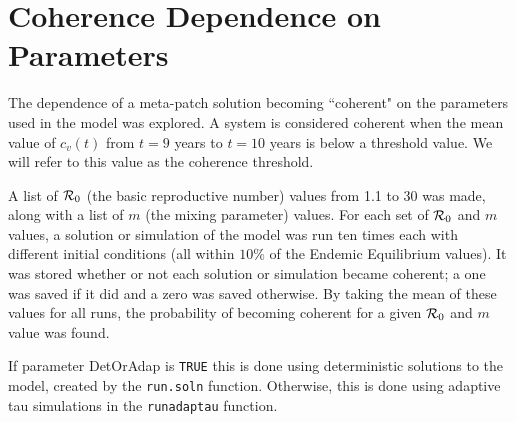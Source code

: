 \documentclass{article}\usepackage[]{graphicx}\usepackage[]{color}
\begin{document}
\section{Coherence Dependence on Parameters} 
The dependence of a meta-patch solution becoming ``coherent" on the parameters used in the model was explored. A system is considered coherent when the mean value of $c_v(t)$ from $t=9$ years to $t=10$ years is below a threshold value. We will refer to this value as the coherence threshold.
\par
A list of ${\cal R}_0$ (the basic reproductive number) values from 1.1 to 30 was made, along with a list of $m$ (the mixing parameter) values. For each set of ${\cal R}_0$ and $m$ values, a solution or simulation of the model was run ten times each with different initial conditions (all within $10\%$ of the Endemic Equilibrium values). It was stored whether or not each solution or simulation became coherent; a one was saved if it did and a zero was saved otherwise. By taking the mean of these values for all runs, the probability of becoming coherent for a given ${\cal R}_0$ and $m$ value was found.
\par
If parameter DetOrAdap is {\color{magenta}\verb|TRUE|} this is done using deterministic solutions to the model, created by the \verb|run.soln| function. Otherwise, this is done using adaptive tau simulations in the \verb|runadaptau| function.
\end{document}
